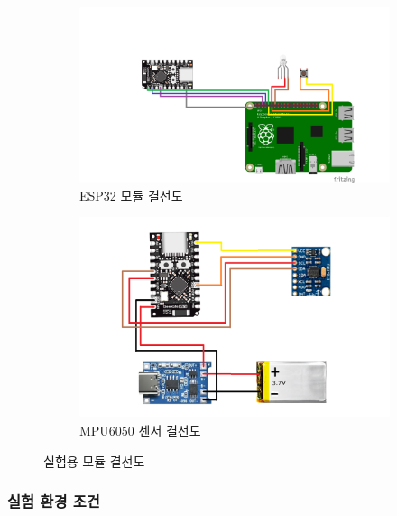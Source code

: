\documentclass[12pt,a4paper]{article}
\begin{document}
\begin{figure}[H]
    \centering
    \begin{subfigure}[b]{0.45\textwidth}
        \includegraphics[width=\textwidth]{images/그림01.png}
        \caption{ESP32 모듈 결선도}
        \label{fig:esp32_circuit}
    \end{subfigure}
    \hfill
    \begin{subfigure}[b]{0.45\textwidth}
        \includegraphics[width=\textwidth]{images/그림02.png}
        \caption{MPU6050 센서 결선도}
        \label{fig:mpu6050_circuit}
    \end{subfigure}
    \caption{실험용 모듈 결선도}
    \label{fig:circuit_diagrams}
\end{figure}

\subsubsection{실험 환경 조건}
\label{subsubsec:experimental_conditions}
\end{document}
